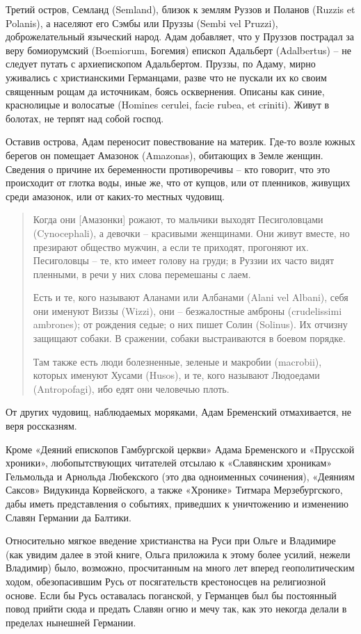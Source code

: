 Третий остров, Семланд (Semland), близок к землям Руззов и Поланов (Ruzzis et Polanis), а населяют его Сэмбы или Пруззы (Sembi vel Pruzzi), доброжелательный языческий народ. Адам добавляет, что у Пруззов пострадал за веру бомиорумский (Boemiorum, Богемия) епископ Адальберт (Adalbertus) – не следует путать с архиепископом Адальбертом. Пруззы, по Адаму, мирно уживались с христианскими Германцами, разве что не пускали их ко своим священным рощам да источникам, боясь осквернения. Описаны как синие, краснолицые и волосатые (Homines cerulei, facie rubea, et criniti). Живут в болотах, не терпят над собой господ.

Оставив острова, Адам переносит повествование на материк. Где-то возле южных берегов он помещает Амазонок (Amazonas), обитающих в Земле женщин. Сведения о причине их беременности противоречивы – кто говорит, что это происходит от глотка воды, иные же, что от купцов, или от пленников, живущих среди амазонок, или от каких-то местных чудовищ.

\begin{quotation}
Когда они [Амазонки] рожают, то мальчики выходят Песиголовцами (Cynocephali), а девочки – красивыми женщинами. Они живут вместе, но презирают общество мужчин, а если те приходят, прогоняют их. Песиголовцы – те, кто имеет голову на груди; в Руззии их часто видят пленными, в речи у них слова перемешаны с лаем.

Есть и те, кого называют Аланами или Албанами (Alani vel Albani), себя они именуют Виззы (Wizzi), они – безжалостные амброны (crudelissimi ambrones); от рождения седые; о них пишет Солин (Solinus). Их отчизну защищают собаки. В сражении, собаки выстраиваются в боевом порядке.

Там также есть люди болезненные, зеленые и макробии (macrobii), которых именуют Хусами (Husos), и те, кого называют Людоедами (Antropofagi), ибо едят они человечью плоть. 
\end{quotation}

От других чудовищ, наблюдаемых моряками, Адам Бременский отмахивается, не веря россказням.

Кроме «Деяний епископов Гамбургской церкви» Адама Бременского и «Прусской хроники», любопытствующих читателей отсылаю к «Славянским хроникам» Гельмольда и Арнольда Любекского (это два одноименных сочинения), «Деяниям Саксов» Видукинда Корвейского, а также «Хронике» Титмара Мерзебургского, дабы иметь представления о событиях, приведших к уничтожению и изменению Славян Германии да Балтики.

Относительно мягкое введение христианства на Руси при Ольге и Владимире (как увидим далее в этой книге, Ольга приложила к этому более усилий, нежели Владимир) было, возможно, просчитанным на много лет вперед геополитическим ходом, обезопасившим Русь от посягательств крестоносцев на религиозной основе. Если бы Русь оставалась поганской, у Германцев был бы постоянный повод прийти сюда и предать Славян огню и мечу так, как это некогда делали в пределах нынешней Германии. 

